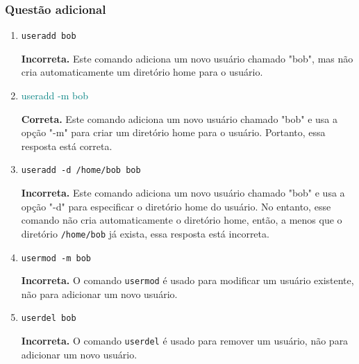 \documentclass[9pt,xcolor=table]{beamer}
\begin{document}
\begin{frame}[fragile]
  \frametitle{Questão adicional}
  \begin{enumerate}
  \item \verb|useradd bob|

    \textbf{Incorreta.} Este comando adiciona um novo usuário chamado "bob", mas não cria automaticamente um diretório home para o usuário.
  \item \textcolor{teal}{useradd -m bob}

    \textbf{Correta.} Este comando adiciona um novo usuário chamado "bob" e usa a opção "-m" para criar um diretório home para o usuário. Portanto, essa resposta está correta.
  \item \verb|useradd -d /home/bob bob|

    \textbf{Incorreta.} Este comando adiciona um novo usuário chamado "bob" e usa a opção "-d" para especificar o diretório home do usuário. No entanto, esse comando não cria automaticamente o diretório home, então, a menos que o diretório \verb|/home/bob| já exista, essa resposta está incorreta.
  \item \verb|usermod -m bob|

    \textbf{Incorreta.} O comando \verb|usermod| é usado para modificar um usuário existente, não para adicionar um novo usuário. 
  \item \verb|userdel bob|

    \textbf{Incorreta.} O comando \verb|userdel| é usado para remover um usuário, não para adicionar um novo usuário.
  \end{enumerate}  
\end{frame}
\end{document}
